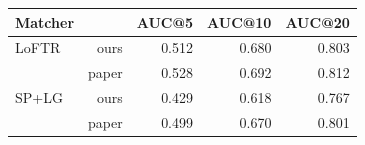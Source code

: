 \begin{tabular}{lrrrr}
\toprule
Matcher &  & AUC@5 & AUC@10 & AUC@20 \\
\midrule
LoFTR & ours & 0.512 & 0.680 & 0.803 \\
 & paper & 0.528 & 0.692 & 0.812 \\
SP+LG & ours & 0.429 & 0.618 & 0.767 \\
 & paper & 0.499 & 0.670 & 0.801 \\
\bottomrule
\end{tabular}